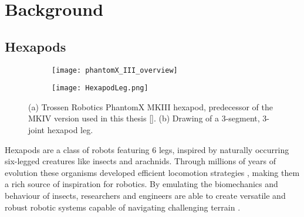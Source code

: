 \chapter{Background}
\label{ch:background}


\section{Hexapods} \label{sec: Hexapods}

\begin{figure}[!h]
	\begin{subfigure}{.5\textwidth} %
		\centering
		\texttt{[image: phantomX\_III\_overview]}  %
		\caption[PhantomX MKIII hexapod]{}
		\label{figure: PhantomX MKIII}
	\end{subfigure}
	\begin{subfigure}{.5\textwidth}
		\centering
		\texttt{[image: HexapodLeg.png]}  
		\caption[Sketch of a hexapod leg]{}
		\label{figure: Hexapod Leg Sketch}
	\end{subfigure}
	\caption[]{(a) Trossen Robotics PhantomX MKIII hexapod, predecessor of the MKIV version used in this thesis [\cite{PhantomX_MKIII}]. (b) Drawing of a 3-segment, 3-joint hexapod leg.}
	\label{figure: Hexapod and hexapod leg}
\end{figure}

Hexapods are a class of robots featuring 6 legs, inspired by naturally occurring six-legged creatures like insects and arachnids.
Through millions of years of evolution these organisms developed efficient locomotion strategies \parencite{neville2006bipedal}, making them a rich source of inspiration for robotics.
By emulating the biomechanics and behaviour of insects, researchers and engineers are able to create versatile and robust robotic systems capable of navigating challenging terrain \parencite{irawan2011optimal, ouyang2021adaptive, schilling2013walknet}.

